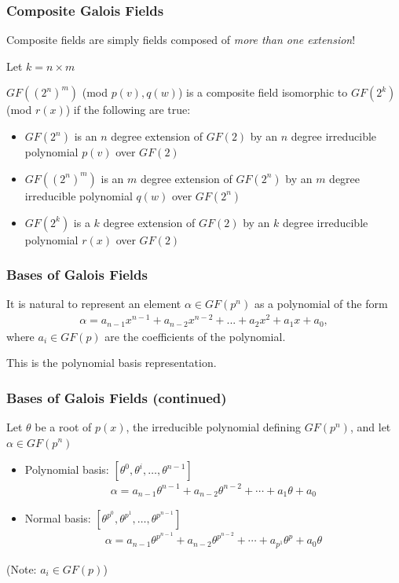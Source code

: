 \documentclass[10pt]{beamer}
\begin{document}
\begin{frame}
	\frametitle{Composite Galois Fields}
	Composite fields are simply fields composed of \emph{more than one extension}!

	\medskip

	Let $k = n \times m$

	\medskip

	$GF((2^n)^m)$ (mod $p(v), q(w)$) is a composite field isomorphic to $GF(2^k)$ (mod $r(x)$) if the following are true:
	\begin{itemize}
		\item $GF(2^n)$ is an $n$ degree extension of $GF(2)$ by an $n$ degree irreducible polynomial $p(v)$ over $GF(2)$
		\item $GF((2^n)^m)$ is an $m$ degree extension of $GF(2^n)$ by an $m$ degree irreducible polynomial $q(w)$ over $GF(2^n)$
		\item $GF(2^k)$ is a $k$ degree extension of $GF(2)$ by an $k$ degree irreducible polynomial $r(x)$ over $GF(2)$
	\end{itemize}
\end{frame}

\begin{frame}
	\frametitle{Bases of Galois Fields}
It is natural to represent an element $\alpha \in GF(p^n)$ as a polynomial of the form
\begin{align*}
\alpha = a_{n-1}x^{n-1} + a_{n-2}x^{n-2} + ... + a_2x^2 + a_1x + a_0,
\end{align*}
where $a_i \in GF(p)$ are the coefficients of the polynomial. 
\pause
\begin{center}
This is the polynomial basis representation.
\end{center}
\end{frame}

\begin{frame}
	\frametitle{Bases of Galois Fields (continued)}
	Let $\theta$ be a root of $p(x)$, the irreducible polynomial defining $GF(p^n)$, and let $\alpha \in GF(p^n)$
	\pause
	\begin{itemize}
		\item Polynomial basis: $[\theta^0,\theta^i,\dots,\theta^{n-1}]$
		\begin{align*}
			\alpha = a_{n-1}\theta^{n-1} + a_{n-2}\theta^{n-2} + \dotsb + a_{1}\theta + a_0
		\end{align*}
		\pause
		\item Normal basis: $[\theta^{p^{0}},\theta^{p^{1}},\dots,\theta^{p^{n-1}}]$
		\begin{align*}
			\alpha = a_{n-1}\theta^{p^{n-1}} + a_{n-2}\theta^{p^{n-2}} + \dotsb + a_{p^{1}}\theta^{p} + a_0\theta
		\end{align*}
	\end{itemize}

	\medskip 
	\begin{center}
		(Note: $a_i \in GF(p)$)
	\end{center}
\end{frame}
\end{document}
